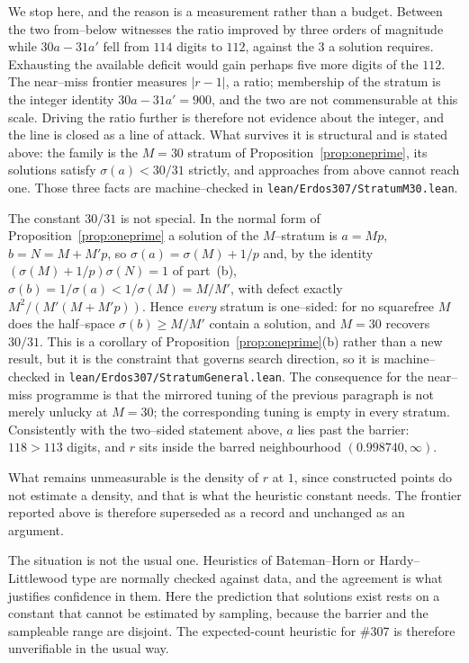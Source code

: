 \documentclass[11pt]{article}
\theoremstyle{definition}
\begin{document}
We stop here, and the reason is a measurement rather than a budget. Between the two from--below
witnesses the ratio improved by three orders of magnitude while $30a-31a'$ fell from $114$ digits to
$112$, against the $3$ a solution requires. Exhausting the available deficit would gain perhaps five
more digits of the $112$. The near--miss frontier measures $|r-1|$, a ratio; membership of the
stratum is the integer identity $30a-31a'=900$, and the two are not commensurable at this scale.
Driving the ratio further is therefore not evidence about the integer, and the line is closed as a
line of attack. What survives it is structural and is stated above: the family is the $M=30$ stratum
of Proposition~\ref{prop:oneprime}, its solutions satisfy $\sigma(a)<30/31$ strictly, and approaches
from above cannot reach one. Those three facts are machine--checked in
\texttt{lean/Erdos307/StratumM30.lean}.

The constant $30/31$ is not special. In the normal form of Proposition~\ref{prop:oneprime} a solution
of the $M$--stratum is $a=Mp$, $b=N=M+M'p$, so $\sigma(a)=\sigma(M)+1/p$ and, by the identity
$(\sigma(M)+1/p)\sigma(N)=1$ of part~(b), $\sigma(b)=1/\sigma(a)<1/\sigma(M)=M/M'$, with defect
exactly $M^2/(M'(M+M'p))$. Hence \emph{every} stratum is one--sided: for no squarefree $M$ does the
half--space $\sigma(b)\ge M/M'$ contain a solution, and $M=30$ recovers $30/31$. This is a corollary
of Proposition~\ref{prop:oneprime}(b) rather than a new result, but it is the constraint that governs
search direction, so it is machine--checked in \texttt{lean/Erdos307/StratumGeneral.lean}. The
consequence for the near--miss programme is that the mirrored tuning of the previous paragraph is not
merely unlucky at $M=30$; the corresponding tuning is empty in every stratum. Consistently with the two--sided statement above, $a$
lies past the barrier: $118>113$ digits, and $r$ sits inside the barred neighbourhood
$(0.998740,\infty)$.

What remains unmeasurable is the density of $r$ at $1$,
since constructed points do not estimate a density, and that is what the heuristic constant needs.
The frontier reported above is therefore superseded as a record and unchanged as an argument.

The situation is not the usual one. Heuristics of Bateman--Horn or Hardy--Littlewood
type are normally checked against data, and the agreement is what justifies confidence in them. Here
the prediction that solutions exist rests on a constant that cannot be estimated by sampling,
because the barrier and the sampleable range are disjoint. The expected-count heuristic for \#307 is
therefore unverifiable in the usual way.
\end{document}
